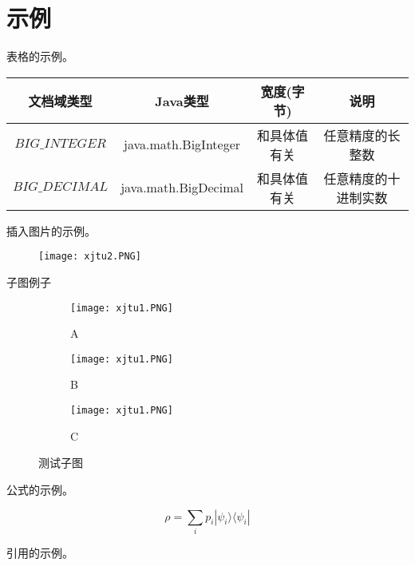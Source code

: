 \section{示例}
表格的示例。

\begin{table}[htbp]\small
  \centering
  \begin{tabular}{cccc}
    \toprule[1.5pt]
    \textbf{文档域类型} & \textbf{Java类型} & \textbf{宽度(字节)} & \textbf{说明} \\
    \midrule[1pt]
    $BIG\_INTEGER$& java.math.BigInteger & 和具体值有关 & 任意精度的长整数 \\
    $BIG\_DECIMAL$ & java.math.BigDecimal & 和具体值有关 & 任意精度的十进制实数 \\
    \bottomrule[1.5pt]
  \end{tabular}
  
\end{table}

插入图片的示例。

\begin{figure}[htbp]
   \centering
   \texttt{[image: xjtu2.PNG]} %
   \label{fig:example}
\end{figure}

子图例子

\begin{figure}[ht!]
    \centering
    \begin{subfigure}{.3\textwidth}
        \centering
        \texttt{[image: xjtu1.PNG]}
        \caption{A}
    \end{subfigure}
    \begin{subfigure}{.3\textwidth}
        \centering
        \texttt{[image: xjtu1.PNG]}
        \caption{B}
    \end{subfigure}
    \begin{subfigure}{.3\textwidth}
        \centering
        \texttt{[image: xjtu1.PNG]}
        \caption{C}
    \end{subfigure}
    \caption{测试子图}
\end{figure}


公式的示例。

\begin{equation}
\rho = \sum_i p_i  |\psi_i \rangle \langle \psi_i |
\end{equation}

引用的示例。


